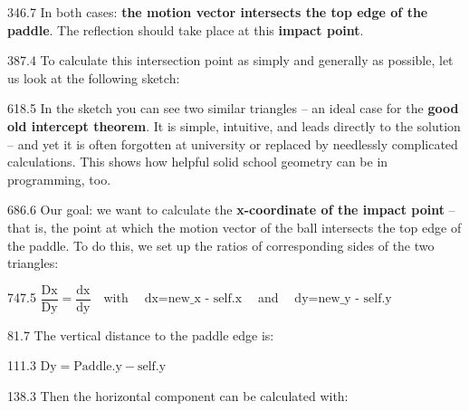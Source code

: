 \documentclass{aslab}
\begin{document}

\begin{region}[pitch=14.2]{346.7}
In both cases: \textbf{the motion vector intersects the top edge of the
paddle}. The reflection should take place at this \textbf{impact point}.
\end{region}

\begin{region}[pitch=13.2]{387.4}
To calculate this intersection point as simply and generally as possible, let
us look at the following sketch:
\end{region}


\begin{region}[pitch=13.6]{618.5}
In the sketch you can see two similar triangles -- an ideal case for the
\textbf{good old intercept theorem}. It is simple, intuitive, and leads
directly to the solution -- and yet it is often forgotten at university or
replaced by needlessly complicated calculations. This shows how helpful solid
school geometry can be in programming, too.
\end{region}

\begin{region}[pitch=13.25]{686.6}
Our goal: we want to calculate the \textbf{x-coordinate of the impact point}
-- that is, the point at which the motion vector of the ball intersects the
top edge of the paddle. To do this, we set up the ratios of corresponding
sides of the two triangles:
\end{region}

\begin{region}[x=147.6,width=390]{747.5}
$\dfrac{\text{Dx}}{\text{Dy}} = \dfrac{\text{dx}}{\text{dy}}$\ \ with\ \
$\text{dx} = \text{new\_x - self.x}$\ \ and\ \
$\text{dy} = \text{new\_y - self.y}$
\end{region}

\nextpage
\begin{region}{81.7}
The vertical distance to the paddle edge is:
\end{region}

\begin{region}{111.3}
\centering $\text{Dy} = \text{Paddle.y} - \text{self.y}$
\end{region}

\begin{region}{138.3}
Then the horizontal component can be calculated with:
\end{region}
\end{document}
